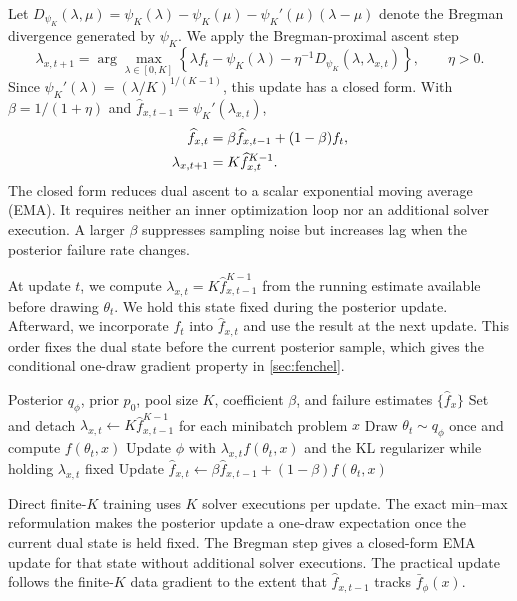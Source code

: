 Let $D_{\psi_K}(\lambda,\mu)=\psi_K(\lambda)-\psi_K(\mu)-\psi_K'(\mu)(\lambda-\mu)$ denote the Bregman divergence generated by $\psi_K$.
We apply the Bregman-proximal ascent step
\begin{equation}
  \lambda_{x,t+1}
  =
  \arg\max_{\lambda\in[0,K]}
  \left\{
    \lambda f_t-\psi_K(\lambda)
    -\eta^{-1}D_{\psi_K}(\lambda,\lambda_{x,t})
  \right\},
  \qquad \eta>0.
  \label{eq:dual-prox}
\end{equation}
Since $\psi_K'(\lambda)=(\lambda/K)^{1/(K-1)}$, this update has a closed form.
With $\beta=1/(1+\eta)$ and $\widehat f_{x,t-1}=\psi_K'(\lambda_{x,t})$,
\begin{align}
  \widehat f_{x,t}
  &=
  \beta\widehat f_{x,t-1}
  +(1-\beta)f_t,
  \notag\\
  \lambda_{x,t+1}
  &=K\widehat f_{x,t}^{K-1}.
  \label{eq:dual-ema}
\end{align}
The closed form reduces dual ascent to a scalar exponential moving average (EMA).
It requires neither an inner optimization loop nor an additional solver execution.
A larger $\beta$ suppresses sampling noise but increases lag when the posterior failure rate changes.

At update $t$, we compute $\lambda_{x,t}=K\widehat f_{x,t-1}^{K-1}$ from the running estimate available before drawing $\theta_t$.
We hold this state fixed during the posterior update.
Afterward, we incorporate $f_t$ into $\widehat f_{x,t}$ and use the result at the next update.
This order fixes the dual state before the current posterior sample, which gives the conditional one-draw gradient property in \cref{sec:fenchel}.

\begin{algorithm}[H]
  \caption{One-draw finite-$K$ posterior learning}
  \label{alg:finite-k}
  \small
  \begin{algorithmic}[1]
    \Require Posterior $q_\phi$, prior $p_0$, pool size $K$, coefficient $\beta$, and failure estimates $\{\widehat f_x\}$
      \State Set and detach $\lambda_{x,t}\gets K\widehat f_{x,t-1}^{K-1}$ for each minibatch problem $x$
      \State Draw $\theta_t\sim q_\phi$ once and compute $f(\theta_t,x)$
      \State Update $\phi$ with $\lambda_{x,t}f(\theta_t,x)$ and the KL regularizer while holding $\lambda_{x,t}$ fixed
      \State Update $\widehat f_{x,t}\gets\beta\widehat f_{x,t-1}+(1-\beta)f(\theta_t,x)$
    \EndFor
  \end{algorithmic}
\end{algorithm}

Direct finite-$K$ training uses $K$ solver executions per update.
The exact min--max reformulation makes the posterior update a one-draw expectation once the current dual state is held fixed.
The Bregman step gives a closed-form EMA update for that state without additional solver executions.
The practical update follows the finite-$K$ data gradient to the extent that $\widehat f_{x,t-1}$ tracks $\bar f_\phi(x)$.


